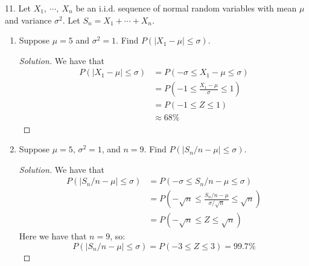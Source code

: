 \documentclass{article}
\newcommand{\be}{\begin{enumerate}}
\newcommand{\ee}{\end{enumerate}}
\newcommand{\abs}[1]{\left|#1\right|}
\newcommand{\parens}[1]{\left(#1\right)}
\begin{document}
	\item[11.] Let $X_1,\ \cdots,\ X_n$ be an i.i.d. sequence of normal random variables with mean
$\mu$ and variance $\sigma^2$. Let $S_n = X_1 + \cdots + X_n$.
	\be 
		\item Suppose $\mu = 5$ and $\sigma^2 = 1$. Find $P\parens{\abs{X_1 - \mu} \leq \sigma}$.
		\begin{proof}[Solution]
		We have that 
		\begin{align*}
		P\parens{\abs{X_1 - \mu} \leq \sigma} &= P\parens{-\sigma \leq X_1 - \mu \leq \sigma} \\
		&= P\parens{-1 \leq \frac{X_1 - \mu}{\sigma} \leq 1} \\
		&= P\parens{-1 \leq Z \leq 1} \\
		&\approx 68\%
		\end{align*}
		\end{proof}
		
		\item Suppose $\mu = 5$, $\sigma^2 = 1$, and $n = 9$. Find $P\parens{\abs{S_n/n - \mu} \leq \sigma}$.
		\begin{proof}[Solution]
		We have that
		\begin{align*}
		P\parens{\abs{S_n / n - \mu} \leq \sigma} &= P\parens{-\sigma \leq S_n / n - \mu \leq \sigma} \\
		&= P\parens{-\sqrt{n} \leq \frac{S_n / n - \mu}{\sigma/\sqrt{n}} \leq \sqrt{n}} \\
		&= P\parens{-\sqrt{n} \leq Z \leq \sqrt{n}}
		\end{align*}
		Here we have that $n = 9$, so:
		$$P\parens{\abs{S_n / n - \mu} \leq \sigma} = P\parens{-3 \leq Z \leq 3} = 99.7\%$$
		\end{proof}
	\ee
	
\end{document}
